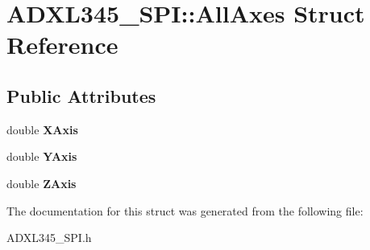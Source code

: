 \hypertarget{structADXL345__SPI_1_1AllAxes}{
\section{ADXL345\_\-SPI::AllAxes Struct Reference}
\label{structADXL345__SPI_1_1AllAxes}
}
\subsection*{Public Attributes}
\begin{DoxyCompactItemize}
\item 
\hypertarget{structADXL345__SPI_1_1AllAxes_a9c0af06b615634557a838befebb72db0}{
double {\bfseries XAxis}}
\label{structADXL345__SPI_1_1AllAxes_a9c0af06b615634557a838befebb72db0}

\item 
\hypertarget{structADXL345__SPI_1_1AllAxes_a611d20158e7573953e3aeadfef94fb91}{
double {\bfseries YAxis}}
\label{structADXL345__SPI_1_1AllAxes_a611d20158e7573953e3aeadfef94fb91}

\item 
\hypertarget{structADXL345__SPI_1_1AllAxes_a1cf27446218feaebdcd7f5aae4ba6acb}{
double {\bfseries ZAxis}}
\label{structADXL345__SPI_1_1AllAxes_a1cf27446218feaebdcd7f5aae4ba6acb}

\end{DoxyCompactItemize}


The documentation for this struct was generated from the following file:\begin{DoxyCompactItemize}
\item 
ADXL345\_\-SPI.h\end{DoxyCompactItemize}
